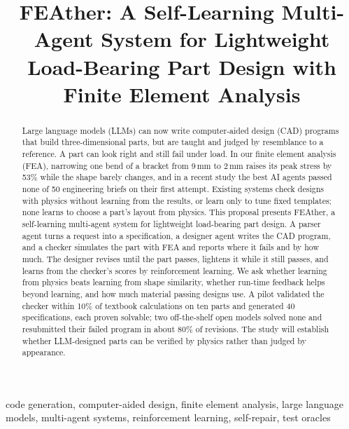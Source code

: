 \documentclass[conference]{IEEEtran}
\begin{document}
\title{FEAther: A Self-Learning Multi-Agent System for Lightweight Load-Bearing Part Design with Finite Element Analysis}

\author{
}

\maketitle

\begin{abstract}
Large language models (LLMs) can now write computer-aided design (CAD) programs that build
three-dimensional parts, but are taught and judged by resemblance to a reference.
A part can look right and still fail under load. In our finite element analysis (FEA), narrowing one
bend of a bracket from 9\,mm to 2\,mm raises its peak stress by 53\% while the shape barely changes,
and in a recent study the best AI agents passed none of 50 engineering briefs on their first attempt.
Existing systems check designs with physics without learning from the results, or learn only to tune
fixed templates; none learns to choose a part's layout from physics. This
proposal presents FEAther, a self-learning multi-agent system for lightweight load-bearing part design.
A parser agent turns a request into a specification, a designer agent writes the CAD program,
and a checker simulates the part with FEA and reports where it fails and by how much. The designer
revises until the part passes, lightens it while it still passes, and learns from the checker's
scores by reinforcement learning. We ask whether learning from physics beats learning from shape
similarity, whether run-time feedback helps beyond learning, and how much material passing designs use.
A pilot validated the checker within 10\% of textbook calculations on ten parts and generated 40
specifications, each proven solvable; two off-the-shelf open models solved none and resubmitted their
failed program in about 80\% of revisions. The study will establish whether LLM-designed parts can be verified by physics rather than
judged by appearance.
\end{abstract}

\begin{IEEEkeywords}
code generation, computer-aided design, finite element analysis, large language models, multi-agent
systems, reinforcement learning, self-repair, test oracles
\end{IEEEkeywords}
\end{document}
